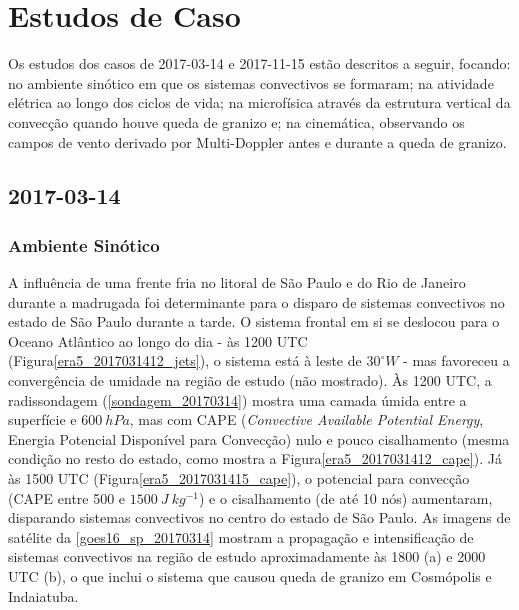 \section{Estudos de Caso}\label{estudo_casos}

Os estudos dos casos de 2017-03-14 e 2017-11-15 estão descritos a seguir, focando: no ambiente sinótico em que os sistemas convectivos se formaram; na atividade elétrica ao longo dos ciclos de vida; na microfísica através da estrutura vertical da convecção quando houve queda de granizo e; na cinemática, observando os campos de vento derivado por Multi-Doppler antes e durante a queda de granizo.

\subsection{2017-03-14}

\subsubsection{Ambiente Sinótico}\label{sinotica_201703014}

A influência de uma frente fria no litoral de São Paulo e do Rio de Janeiro durante a madrugada foi determinante para o disparo de sistemas convectivos no estado de São Paulo durante a tarde. O sistema frontal em si se deslocou para o Oceano Atlântico ao longo do dia - às 1200 UTC (Figura\autoref{era5_2017031412_jets}), o sistema está à leste de $30^{\circ}W$ - mas favoreceu a convergência de umidade na região de estudo (não mostrado). Às 1200 UTC, a radissondagem (\autoref{sondagem_20170314}) mostra uma camada úmida entre a superfície e $600\:hPa$, mas com CAPE (\textit{Convective Available Potential Energy}, Energia Potencial Disponível para Convecção) nulo e pouco cisalhamento (mesma condição no resto do estado, como mostra a Figura\autoref{era5_2017031412_cape}). Já às 1500 UTC (Figura\autoref{era5_2017031415_cape}), o potencial para convecção (CAPE entre 500 e $1500\:J\:kg^{-1}$) e o cisalhamento (de até 10 nós) aumentaram, disparando sistemas convectivos no centro do estado de São Paulo. As imagens de satélite da \autoref{goes16_sp_20170314} mostram a propagação e intensificação de sistemas convectivos na região de estudo aproximadamente às 1800 (a) e 2000 UTC (b), o que inclui o sistema que causou queda de granizo em Cosmópolis e Indaiatuba.

